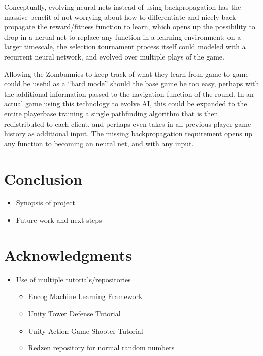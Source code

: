 \documentclass[letterpaper]{article}
\begin{document}
Conceptually, evolving neural nets instead of using backpropagation
has the massive benefit of not worrying about how to differentiate and nicely
back-propagate the reward/fitness function to learn, which opens up the
possibility to drop in a nerual net to replace any function in a learning
environment; on a larger timescale, the selection tournament process itself
could modeled with a recurrent neural network, and evolved over multiple plays
of the game.

Allowing the Zombunnies to keep track of what they learn from game to game could
be useful as a ``hard mode'' should the base game be too easy, perhaps with the
additional information passed to the navigation function of the round. In an actual game
using this technology to evolve AI, this could be expanded to the entire
playerbase training a single pathfinding algorithm that is then redistributed to
each client, and perhaps even takes in all previous player game history as
additional input. The missing backpropagation requirement opens up
any function to becoming an neural net, and with any input.

\section{Conclusion}
\begin{itemize}
    \item Synopsis of project
    \item Future work and next steps
\end{itemize}

\section{Acknowledgments}
\begin{itemize}
    \item Use of multiple tutorials/repositories
    \begin{itemize}
        \item Encog Machine Learning Framework
        \item Unity Tower Defense Tutorial
        \item Unity Action Game Shooter Tutorial
        \item Redzen repository for normal random numbers
    \end{itemize}
\end{itemize}

\footnotesize

\end{document}
